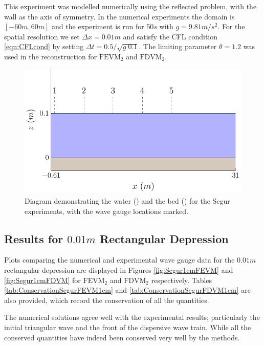 This experiment was modelled numerically using the reflected problem, with the wall as the axis of symmetry. In the numerical experiments the domain is $[-60m,60m]$ and the experiment is run for $ 50s$ with $g = 9.81m/s^2$. For the spatial resolution we set $\Delta x = 0.01m$ and satisfy the CFL condition \eqref{eqn:CFLcond} by setting $\Delta t = 0.5 / \sqrt{g \; 0.1}$. The limiting parameter $\theta = 1.2$ was used in the reconstruction for $\text{FEVM}_2$ and $\text{FDVM}_2$.

\begin{figure}
	\centering
	\includegraphics[width=\textwidth]{./chp6/figures/Experiment/Segur/WaveTank.pdf}
	\caption{Diagram demonstrating the water () and the bed () for the Segur experiments, with the wave gauge locations marked.}
	\label{fig:SegurWT}
\end{figure}

\subsection{Results for $0.01m$ Rectangular Depression}

Plots comparing the numerical and experimental wave gauge data for the $0.01m$ rectangular depression are displayed in Figures \ref{fig:Segur1cmFEVM} and \ref{fig:Segur1cmFDVM} for $\text{FEVM}_2$ and $\text{FDVM}_2$ respectively. Tables \ref{tab:ConservationSegurFEVM1cm} and \ref{tab:ConservationSegurFDVM1cm} are also provided, which record the conservation of all the quantities. 

The numerical solutions agree well with the experimental results; particularly the initial triangular wave and the front of the dispersive wave train. While all the conserved quantities have indeed been conserved very well by the methods.  

